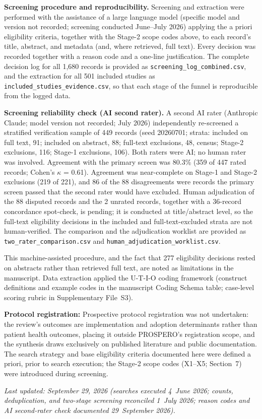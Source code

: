 \medskip
\noindent\textbf{Screening procedure and reproducibility.} Screening and
extraction were performed with the assistance of a large language model
(specific model and version not recorded; screening conducted June--July 2026) applying the a priori
eligibility criteria, together with the Stage-2 scope codes above, to each
record's title, abstract, and metadata (and, where retrieved, full text). Every decision was recorded together with a reason
code and a one-line justification. The complete decision log for all 1{,}680
records is provided as \texttt{screening\_log\_combined.csv}, and the extraction
for all 501 included studies as \texttt{included\_studies\_evidence.csv}, so that
each stage of the funnel is reproducible from the logged data.

\medskip
\noindent\textbf{Screening reliability check (AI second rater).} A second AI
rater (Anthropic Claude; model version not recorded; July 2026)
independently re-screened a stratified verification sample of 449 records
(seed 20260701; strata: included on full text, 91; included on abstract, 88;
full-text exclusions, 48, census; Stage-2 exclusions, 116; Stage-1 exclusions,
106). Both raters were AI; no human rater was involved. Agreement with the
primary screen was 80.3\% (359 of 447 rated records; Cohen's $\kappa$ = 0.61).
Agreement was near-complete on Stage-1 and Stage-2 exclusions (219 of 221), and
86 of the 88 disagreements were records the primary screen passed that the
second rater would have excluded. Human adjudication of the 88 disputed
records and the 2 unrated records, together with a 36-record concordance
spot-check, is pending; it is conducted at title/abstract level, so the
full-text eligibility decisions in the included and full-text-excluded strata
are not human-verified. The
comparison and the adjudication worklist are provided as
\texttt{two\_rater\_comparison.csv} and
\texttt{human\_adjudication\_worklist.csv}. %

\medskip
\noindent This machine-assisted procedure, and the fact that 277 eligibility decisions rested on
abstracts rather than retrieved full text, are noted as limitations in the
manuscript. Data extraction applied the U-T-I-O coding framework (construct
definitions and example codes in the manuscript Coding Schema table; case-level
scoring rubric in Supplementary File~S3).

\medskip
\noindent\textbf{Protocol registration:} Prospective protocol registration was not
undertaken: the review's outcomes are implementation and adoption determinants
rather than patient health outcomes, placing it outside PROSPERO's registration
scope, and the synthesis draws exclusively on published literature and public
documentation. The search strategy and base eligibility criteria documented
here were defined a priori, prior to search execution; the Stage-2 scope codes
(X1--X5; Section~7) were introduced during screening.

\medskip
\noindent\textit{Last updated: September 29, 2026 (searches executed 4~June 2026;
counts, deduplication, and two-stage screening reconciled 1~July 2026; reason
codes and AI second-rater check documented 29~September 2026).}
